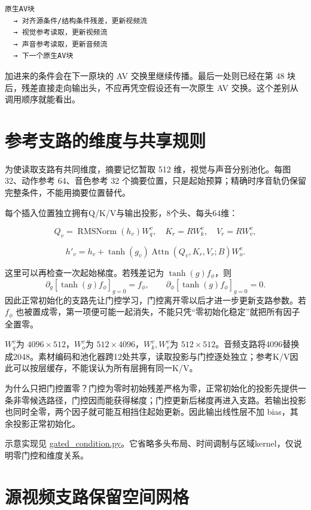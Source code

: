 \begin{verbatim}
原生AV块
  → 对齐源条件/结构条件残差，更新视频流
  → 视觉参考读取，更新视频流
  → 声音参考读取，更新音频流
  → 下一个原生AV块
\end{verbatim}

加进来的条件会在下一原块的 AV 交换里继续传播。最后一处则已经在第 48 块后，残差直接走向输出头，不应再凭空假设还有一次原生 AV 交换。这个差别从调用顺序就能看出。

\section{参考支路的维度与共享规则}\label{seedance-m21-ux53c2ux8003ux652fux8defux7684ux7ef4ux5ea6ux4e0eux5171ux4eabux89c4ux5219}

为使读取支路有共同维度，摘要记忆暂取 512 维，视觉与声音分别池化。每图 32、动作参考 64、音色参考 32 个摘要位置，只是起始预算；精确时序音轨仍保留完整条件，不能用摘要位置替代。

每个插入位置独立拥有Q/K/V与输出投影，8个头、每头64维：

\[
Q_v=\operatorname{RMSNorm}(h_v)W_q^v,\quad
K_r=RW_k^v,\quad V_r=RW_v^v,
\]

\[
h'_v=h_v+\tanh(g_v)
\operatorname{Attn}(Q_v,K_r,V_r;B)W_o^v.
\]

这里可以再检查一次起始梯度。若残差记为 \(\tanh(g)f_\phi\)，则
\[
\partial_g[\tanh(g)f_\phi]_{g=0}=f_\phi,
\qquad
\partial_\phi[\tanh(g)f_\phi]_{g=0}=0.
\]
因此正常初始化的支路先让门控学习，门控离开零以后才进一步更新支路参数。若 \(f_\phi\) 也被置成零，第一项便可能一起消失，不能只凭“零初始化稳定”就把所有因子全置零。

\(W_q^v\)为 \(4096\times512\)，\(W_o^v\)为 \(512\times4096\)，\(W_k^v,W_v^v\)为 \(512\times512\)。音频支路将4096替换成2048。素材编码和池化器跨12处共享，读取投影与门控逐处独立；参考K/V因此可以按层缓存，不能误认为所有层拥有同一K/V。

为什么只把门控置零？门控为零时初始残差严格为零，正常初始化的投影先提供一条非零候选路径，门控因而能获得梯度；门控更新后梯度再进入支路。若输出投影也同时全零，两个因子就可能互相挡住起始更新。因此输出线性层不加 bias，其余投影正常初始化。

示意实现见 \hyperref[code-gated-condition]{gated\_condition.py}。它省略多头布局、时间调制与区域kernel，仅说明零门控和维度关系。

\section{源视频支路保留空间网格}\label{seedance-m21-ux6e90ux89c6ux9891ux652fux8defux4fddux7559ux7a7aux95f4ux7f51ux683c}

